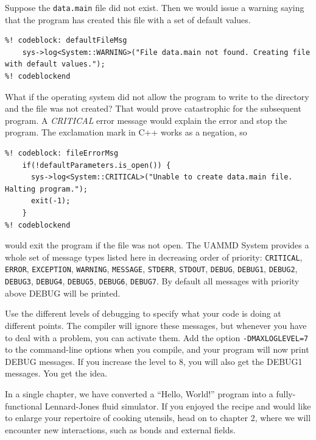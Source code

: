 Suppose the \texttt{data.main} file did not exist. Then we would issue a warning
saying that the program has created this file with a set of default values.
\begin{lstlisting}
%! codeblock: defaultFileMsg
    sys->log<System::WARNING>("File data.main not found. Creating file with default values.");
%! codeblockend
\end{lstlisting}
What if the operating system did not allow the program to write to the directory
and the file was not created? That would prove catastrophic for the subsequent
program. A \textit{CRITICAL} error message would explain the error and stop the
program. The exclamation mark in C++ works as a negation, so
\begin{lstlisting}
%! codeblock: fileErrorMsg
    if(!defaultParameters.is_open()) {
      sys->log<System::CRITICAL>("Unable to create data.main file. Halting program.");
      exit(-1);
    }
%! codeblockend
\end{lstlisting}
would exit the program if the file was not open. The UAMMD System provides a
whole set of message types listed here in decreasing order of priority:
\texttt{CRITICAL}, \texttt{ERROR}, \texttt{EXCEPTION}, \texttt{WARNING},
\texttt{MESSAGE}, \texttt{STDERR}, \texttt{STDOUT}, \texttt{DEBUG},
\texttt{DEBUG1}, \texttt{DEBUG2}, \texttt{DEBUG3}, \texttt{DEBUG4},
\texttt{DEBUG5}, \texttt{DEBUG6}, \texttt{DEBUG7}. By default all messages
with priority above DEBUG will be printed.

Use the different levels of debugging to specify what your code is doing at 
different points. The compiler will ignore these messages, but whenever you have 
to deal with a problem, you can activate them. Add the option 
\texttt{-DMAXLOGLEVEL=7} to the command-line options when you compile, and your 
program will now print DEBUG messages. If you increase the level to 8, you will 
also get the DEBUG1 messages. You get the idea.

In a single chapter, we have converted a ``Hello, World!'' program into a 
fully-functional Lennard-Jones fluid simulator. If you enjoyed the recipe and
would like to enlarge your repertoire of cooking utensils, head on to chapter 2,
where we will encounter new interactions, such as bonds and external fields.

